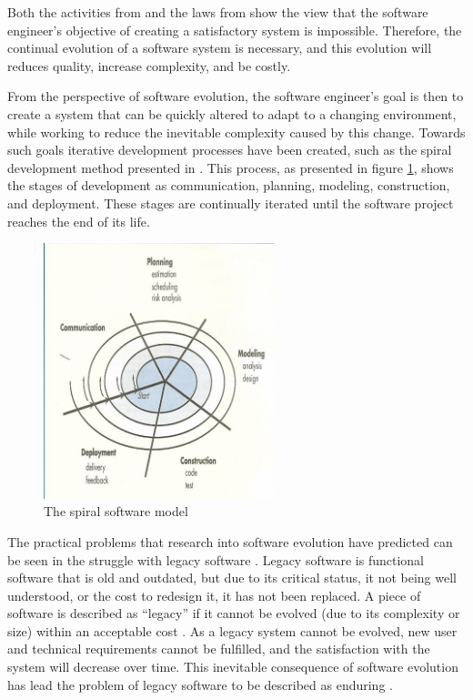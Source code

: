 Both the activities from \cite{Lientz1980} and the laws from \citep{lehman1980} show the view that
the software engineer's objective of creating a satisfactory system is impossible.
Therefore, the continual evolution of a software system is necessary, and this evolution will reduces quality, increase complexity, and be costly.

From the perspective of software evolution, the software engineer's goal is then to create a system that can be quickly altered to adapt to a changing environment, 
while working to reduce the inevitable complexity caused by this change.
Towards such goals iterative development processes have been created, such as the spiral development method presented in \citep{Boehm1988}.
This process, as presented in figure \ref{background.spiral},
shows the stages of development as communication, planning, modeling, construction, and deployment. 
These stages are continually iterated until the software project reaches the end of its life. 
\begin{figure}[h!]
\begin{center}
  \includegraphics[width=0.6\textwidth]{backgroundpics/spiral}
  \caption{The spiral software model}
  \label{background.spiral}
\end{center}
\end{figure}

The practical problems that research into software evolution have predicted can be seen in the struggle with legacy software \citep{Bennett1995}.
Legacy software is functional software that is old and outdated, but due to its critical status, it not being well understood, or the cost to redesign it, 
it has not been replaced.
A piece of software is described as ``legacy'' if it cannot be evolved  (due to its complexity or size) within an acceptable cost \citep{Bisbal1999}.
As a legacy system cannot be evolved, new user and technical requirements cannot be fulfilled, and the satisfaction with the system will decrease over time.
This inevitable consequence of software evolution has lead the problem of legacy software to be described as enduring \citep{Bennett2000}. 

